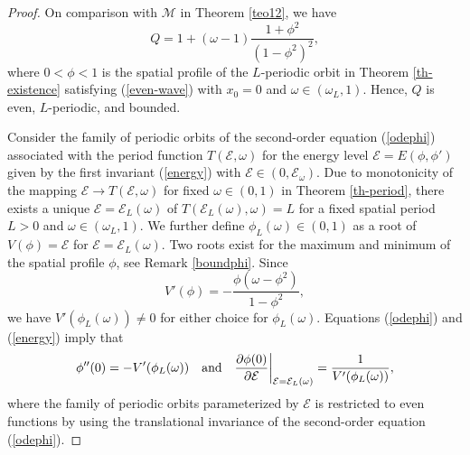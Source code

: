 \documentclass[12pt,reqno]{amsart}
\numberwithin{equation}{section}
\numberwithin{figure}{section}
\begin{document}
\begin{proof} 
	On comparison with $\mathcal{M}$ in Theorem \ref{teo12}, we have 
\begin{equation}
\label{Q-def}
	Q = 1 + (\omega - 1) \frac{1+ \phi^2}{(1-\phi^2)^2},
\end{equation}
	where $0 < \phi < 1$ is the spatial profile of the $L$-periodic orbit in Theorem \ref{th-existence} satisfying (\ref{even-wave}) with $x_0 = 0$ and $\omega \in (\omega_L,1)$. Hence, $Q$ is even, $L$-periodic, and bounded. 
	
	Consider the family of periodic orbits of the second-order equation (\ref{odephi}) associated with the period function $T(\mathcal{E},\omega)$ for the energy level $\mathcal{E} = E(\phi,\phi')$ given by the first invariant (\ref{energy}) with $\mathcal{E}\in (0,\mathcal{E}_{\omega})$. Due to monotonicity 
	of the mapping $\mathcal{E}\to T(\mathcal{E},\omega)$ for fixed $\omega \in (0,1)$ in Theorem \ref{th-period}, there exists a unique $\mathcal{E} = \mathcal{E}_L(\omega)$ of $T(\mathcal{E}_L(\omega),\omega) = L$ for a fixed spatial period $L > 0$ and $\omega \in (\omega_L,1)$. We further define $\phi_L(\omega) \in (0,1)$ as a root of $V(\phi) = \mathcal{E}$ for $\mathcal{E} = \mathcal{E}_L(\omega)$. Two roots exist for the maximum and minimum of the spatial profile $\phi$, see Remark \ref{boundphi}. Since 
	$$
	V'(\phi) = -\frac{\phi(\omega - \phi^2)}{1-\phi^2},
	$$ 
	we have $V'(\phi_L(\omega)) \neq 0$ for either choice for $\phi_L(\omega)$. 
	Equations (\ref{odephi}) and (\ref{energy}) imply that 
\begin{equation}
\label{property-energy}
	\phi''(0) = -V'(\phi_L(\omega)) \quad \mbox{\rm and} \quad 
	\frac{\partial \phi(0)}{\partial \mathcal{E}} \biggr|_{\mathcal{E} = \mathcal{E}_L(\omega)} = \frac{1}{V'(\phi_L(\omega))},
\end{equation}
where the family of periodic orbits parameterized by $\mathcal{E}$ is restricted to even functions by using 
the translational invariance of the second-order equation (\ref{odephi}).
	

\end{proof}
\end{document}
